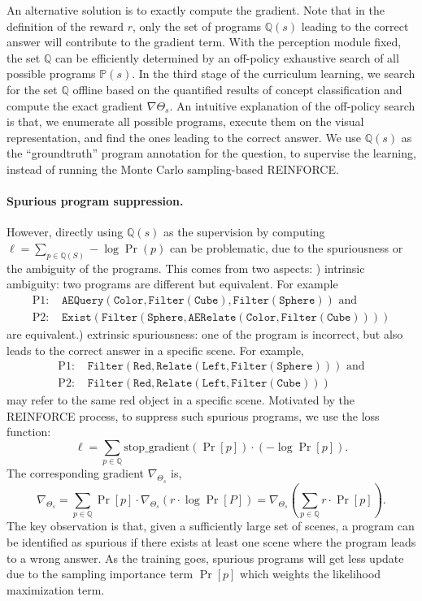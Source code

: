 \documentclass{article} %
\begin{document}
An alternative solution is to exactly compute the gradient. Note that in the definition of the reward $r$, only the set of programs $\mathbb Q(s)$ leading to the correct answer will contribute to the gradient term. With the perception module fixed, the set $\mathbb Q$ can be efficiently determined by an off-policy exhaustive search of all possible programs $\mathbb P(s)$. In the third stage of the curriculum learning, we search for the set $\mathbb Q$ offline based on the quantified results of concept classification and compute the exact gradient $\nabla \Theta_s$. An intuitive explanation of the off-policy search is that, we enumerate all possible programs, execute them on the visual representation, and find the ones leading to the correct answer. We use $\mathbb Q(s)$ as the ``groundtruth'' program annotation for the question, to supervise the learning, instead of running the Monte Carlo sampling-based REINFORCE.

\paragraph{Spurious program suppression.}
However, directly using $\mathbb Q(s)$ as the supervision by computing $\ell = \sum_{p \in \mathbb Q(S)} -\log \Pr(p)$ can be problematic, due to the spuriousness or the ambiguity of the programs. This comes from two aspects: ) intrinsic ambiguity: two programs are different but equivalent. For example
\begin{align*}
    \text{P1: }&\texttt{AEQuery}(\texttt{Color}, \texttt{Filter}(\texttt{Cube}), \texttt{Filter}(\texttt{Sphere})) \text{~and}\\
    \text{P2: }&\texttt{Exist}(\texttt{Filter}(\texttt{Sphere}, \texttt{AERelate}(\texttt{Color}, \texttt{Filter}(\texttt{Cube}))))
\end{align*}
are equivalent.) extrinsic spuriousness: one of the program is incorrect, but also leads to the correct answer in a specific scene. For example,
\begin{align*}
    \text{P1: }& \texttt{Filter}(\texttt{Red}, \texttt{Relate}(\texttt{Left}, \texttt{Filter}(\texttt{Sphere}))) \text{~and}\\
    \text{P2: }&\texttt{Filter}(\texttt{Red}, \texttt{Relate}(\texttt{Left}, \texttt{Filter}(\texttt{Cube})))
\end{align*}
may refer to the same red object in a specific scene. Motivated by the REINFORCE process, to suppress such spurious programs, we use the loss function: 
\[ \ell = \sum_{p \in \mathbb{Q}} \text{stop\_gradient}(\Pr[p]) \cdot (-\log \Pr[p]). \]
The corresponding gradient $\nabla_{\Theta_s}$ is,
\[ \nabla_{\Theta_s} = \sum_{p \in \mathbb{Q}} \Pr[p] \cdot \nabla_{\Theta_s}\left(r \cdot \log \Pr[P]\right) = \nabla_{\Theta_s} \left( \sum_{p \in \mathbb{Q}} r \cdot \Pr[p] \right). \]
The key observation is that, given a sufficiently large set of scenes, a program can be identified as spurious if there exists at least one scene where the program leads to a wrong answer. As the training goes, spurious programs will get less update due to the sampling importance term $\Pr[p]$ which weights the likelihood maximization term.
\end{document}

